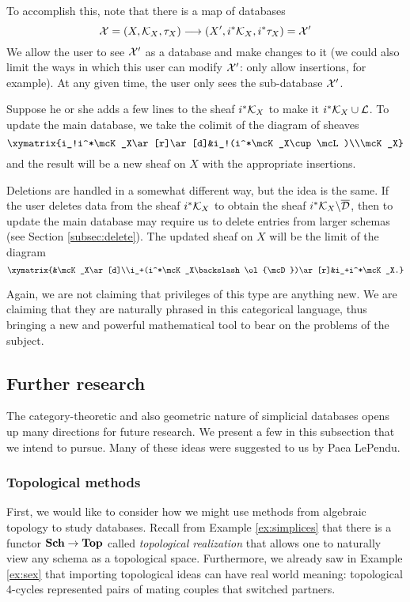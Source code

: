 \documentclass{amsart}
\begin{document}
To accomplish this, note that there is a map of databases $$\mathcal{X}=(X,\mathcal{K}_X,\tau_X)\longrightarrow(X',i^*\mathcal{K}_X,i^*\tau_X)=\mathcal{X}'$$  We allow the user to see $\mathcal{X}'$ as a database and make changes to it (we could also limit the ways in which this user can modify $\mathcal{X}'$: only allow insertions, for example).  At any given time, the user only sees the sub-database $\mathcal{X}'$.  

Suppose he or she adds a few lines to the sheaf $i^*\mathcal{K}_X$ to make it $i^*\mathcal{K}_X\cup\mathcal{L}$.  To update the main database, we take the colimit of the diagram of sheaves $$\xymatrix{i_!i^*\mcK_X\ar[r]\ar[d]&i_!(i^*\mcK_X\cup\mcL)\\\mcK_X}$$ and the result will be a new sheaf on $X$ with the appropriate insertions.  

Deletions are handled in a somewhat different way, but the idea is the same.  If the user deletes data from the sheaf $i^*\mathcal{K}_X$ to obtain the sheaf $i^*\mathcal{K}_X\backslash\overline{\mathcal{D}}$, then to update the main database may require us to delete entries from larger schemas (see Section \ref{subsec:delete}).  The updated sheaf on $X$ will be the limit of the diagram $$\xymatrix{&\mcK_X\ar[d]\\i_+(i^*\mcK_X\backslash\ol{\mcD})\ar[r]&i_+i^*\mcK_X.}$$

Again, we are not claiming that privileges of this type are anything new.  We are claiming that they are naturally phrased in this categorical language, thus bringing a new and powerful mathematical tool to bear on the problems of the subject.

\subsection{Further research}\label{subsec:further research}

The category-theoretic and also geometric nature of simplicial databases opens up many directions for future research.  We present a few in this subsection that we intend to pursue.  Many of these ideas were suggested to us by Paea LePendu.

\subsubsection{Topological methods}\label{subsubsec:top}

First, we would like to consider how we might use methods from algebraic topology to study databases.  Recall from Example \ref{ex:simplices} that there is a functor ${\bf Sch}\rightarrow{\bf Top}$ called {\em topological realization} that allows one to naturally view any schema as a topological space.  Furthermore, we already saw in Example \ref{ex:sex} that importing topological ideas can have real world meaning: topological 4-cycles represented pairs of mating couples that switched partners.  
\end{document}
